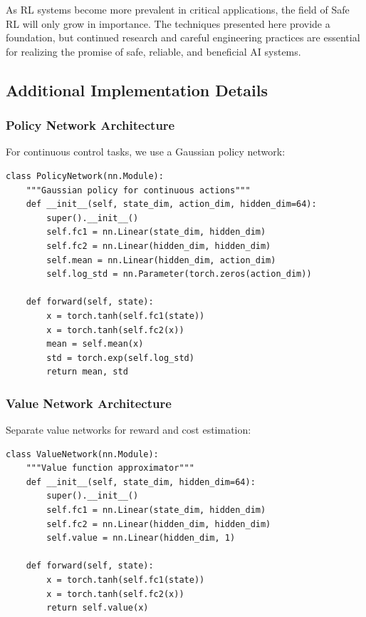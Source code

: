 \documentclass[12pt]{article}
\begin{document}
{{{{As RL systems become more prevalent in critical applications, the field of Safe RL will only grow in importance. The techniques presented here provide a foundation, but continued research and careful engineering practices are essential for realizing the promise of safe, reliable, and beneficial AI systems.

\subsection{Additional Implementation Details}

\subsubsection{Policy Network Architecture}

For continuous control tasks, we use a Gaussian policy network:

\begin{verbatim}
class PolicyNetwork(nn.Module):
    """Gaussian policy for continuous actions"""
    def __init__(self, state_dim, action_dim, hidden_dim=64):
        super().__init__()
        self.fc1 = nn.Linear(state_dim, hidden_dim)
        self.fc2 = nn.Linear(hidden_dim, hidden_dim)
        self.mean = nn.Linear(hidden_dim, action_dim)
        self.log_std = nn.Parameter(torch.zeros(action_dim))

    def forward(self, state):
        x = torch.tanh(self.fc1(state))
        x = torch.tanh(self.fc2(x))
        mean = self.mean(x)
        std = torch.exp(self.log_std)
        return mean, std
\end{verbatim}

\subsubsection{Value Network Architecture}

Separate value networks for reward and cost estimation:

\begin{verbatim}
class ValueNetwork(nn.Module):
    """Value function approximator"""
    def __init__(self, state_dim, hidden_dim=64):
        super().__init__()
        self.fc1 = nn.Linear(state_dim, hidden_dim)
        self.fc2 = nn.Linear(hidden_dim, hidden_dim)
        self.value = nn.Linear(hidden_dim, 1)

    def forward(self, state):
        x = torch.tanh(self.fc1(state))
        x = torch.tanh(self.fc2(x))
        return self.value(x)
\end{verbatim}

}}}}
\end{document}
